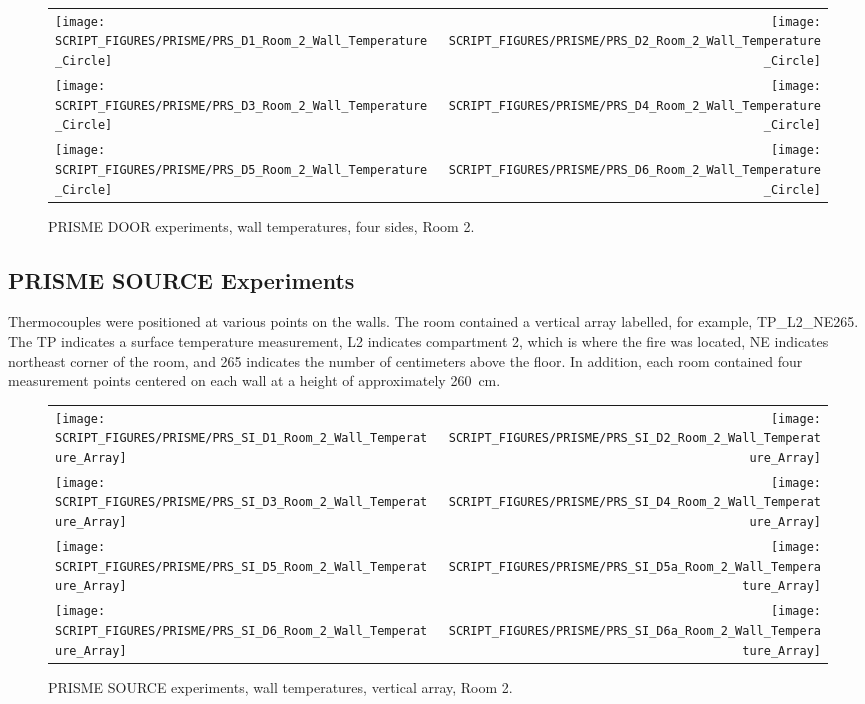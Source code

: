 \begin{figure}[p]
\begin{tabular*}{\textwidth}{l@{\extracolsep{\fill}}r}
\texttt{[image: SCRIPT\_FIGURES/PRISME/PRS\_D1\_Room\_2\_Wall\_Temperature\_Circle]} &
\texttt{[image: SCRIPT\_FIGURES/PRISME/PRS\_D2\_Room\_2\_Wall\_Temperature\_Circle]} \\
\texttt{[image: SCRIPT\_FIGURES/PRISME/PRS\_D3\_Room\_2\_Wall\_Temperature\_Circle]} &
\texttt{[image: SCRIPT\_FIGURES/PRISME/PRS\_D4\_Room\_2\_Wall\_Temperature\_Circle]} \\
\texttt{[image: SCRIPT\_FIGURES/PRISME/PRS\_D5\_Room\_2\_Wall\_Temperature\_Circle]} &
\texttt{[image: SCRIPT\_FIGURES/PRISME/PRS\_D6\_Room\_2\_Wall\_Temperature\_Circle]}
\end{tabular*}
\caption{PRISME DOOR experiments, wall temperatures, four sides, Room 2.}
\label{PRISME_Wall_Circle_Room_2}
\end{figure}

\clearpage

\subsection{PRISME SOURCE Experiments}

Thermocouples were positioned at various points on the walls. The room contained a vertical array labelled, for example, TP\_L2\_NE265. The TP indicates a surface temperature measurement, L2 indicates compartment 2, which is where the fire was located, NE indicates northeast corner of the room, and 265 indicates the number of centimeters above the floor. In addition, each room contained four measurement points centered on each wall at a height of approximately 260~cm.

\begin{figure}[!ht]
\begin{tabular*}{\textwidth}{l@{\extracolsep{\fill}}r}
\texttt{[image: SCRIPT\_FIGURES/PRISME/PRS\_SI\_D1\_Room\_2\_Wall\_Temperature\_Array]} &
\texttt{[image: SCRIPT\_FIGURES/PRISME/PRS\_SI\_D2\_Room\_2\_Wall\_Temperature\_Array]} \\
\texttt{[image: SCRIPT\_FIGURES/PRISME/PRS\_SI\_D3\_Room\_2\_Wall\_Temperature\_Array]} &
\texttt{[image: SCRIPT\_FIGURES/PRISME/PRS\_SI\_D4\_Room\_2\_Wall\_Temperature\_Array]} \\
\texttt{[image: SCRIPT\_FIGURES/PRISME/PRS\_SI\_D5\_Room\_2\_Wall\_Temperature\_Array]} &
\texttt{[image: SCRIPT\_FIGURES/PRISME/PRS\_SI\_D5a\_Room\_2\_Wall\_Temperature\_Array]} \\
\texttt{[image: SCRIPT\_FIGURES/PRISME/PRS\_SI\_D6\_Room\_2\_Wall\_Temperature\_Array]} &
\texttt{[image: SCRIPT\_FIGURES/PRISME/PRS\_SI\_D6a\_Room\_2\_Wall\_Temperature\_Array]}
\end{tabular*}
\caption{PRISME SOURCE experiments, wall temperatures, vertical array, Room 2.}
\label{PRISME_SOURCE_Wall_Array_Room_2}
\end{figure}

